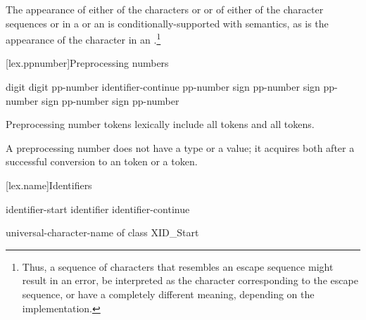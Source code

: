 \documentclass{wg21}
\begin{document}
\pnum
The appearance of either of the characters  or \tcode{\textbackslash} or of
either of the character sequences \tcode{/*} or \tcode{//} in a
 or an 
is conditionally-supported with  semantics, as is the appearance of the character
 in an .\footnote{Thus, a sequence of characters
    that resembles an escape sequence might result in an error, be interpreted as the
    character corresponding to the escape sequence, or have a completely different meaning,
    depending on the implementation.}%

[lex.ppnumber]{Preprocessing numbers}

%
\begin{bnf}
    \br
    digit\br
     digit\br
    pp-number identifier-continue\br
    \br
    \br
    \br
    pp-number  sign\br
    pp-number  sign\br
    pp-number  sign\br
    pp-number  sign\br
    pp-number 
\end{bnf}

\pnum
Preprocessing number tokens lexically include
all  tokens and
all  tokens.

\pnum
A preprocessing number does not have a type or a value; it acquires both
after a successful conversion to
an  token or
a  token.%

[lex.name]{Identifiers}

%
\begin{bnf}
    \br
    identifier-start\br
    identifier identifier-continue\br
\end{bnf}

\begin{bnf}
   \br
   \br
   \added{_}\br
    universal-character-name of class XID_Start
\end{bnf}
\end{document}
